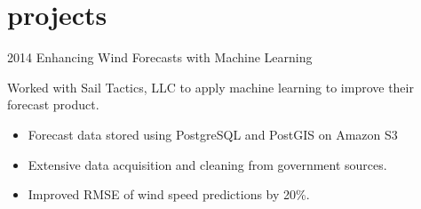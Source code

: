 \documentclass[]{friggeri-cv} %
\begin{document}
\section{projects}

\begin{entrylist}
\entry
{2014}
{Enhancing Wind Forecasts with Machine Learning}
{}
{Worked with Sail Tactics, LLC to apply machine learning to improve their forecast product.\begin{itemize}
\item Forecast data stored using PostgreSQL and PostGIS on Amazon S3
\item Extensive data acquisition and cleaning from government sources. 
\item Improved RMSE of wind speed predictions by 20\%.
\end{itemize}
}
\end{entrylist}


%

\end{document}
